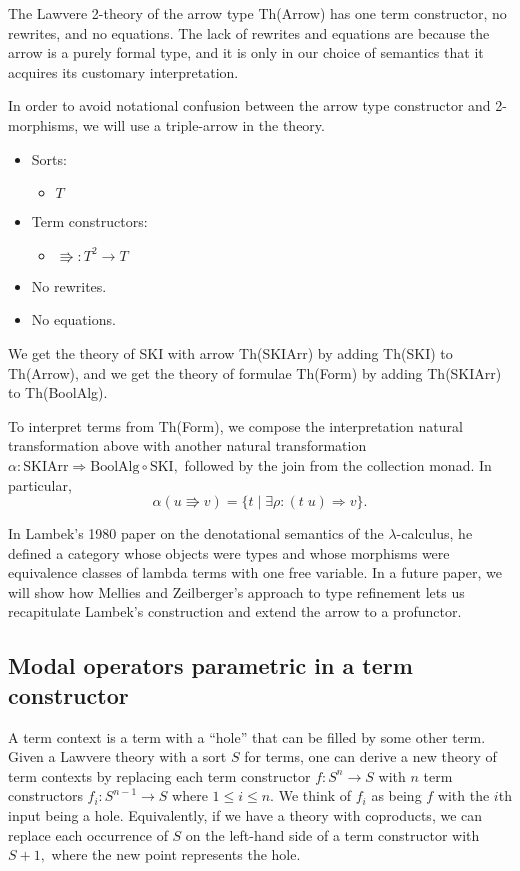 \documentclass{llncs}
\newcommand{\maps}{\colon}
\begin{document}
The Lawvere 2-theory of the arrow type Th(Arrow) has one term constructor, no rewrites, and no equations.  The lack of rewrites and equations are because the arrow is a purely formal type, and it is only in our choice of semantics that it acquires its customary interpretation.

In order to avoid notational confusion between the arrow type constructor and 2-morphisms, we will use a triple-arrow in the theory.
\begin{itemize}
  \item Sorts:
  \begin{itemize}
    \item $T$
  \end{itemize}
  \item Term constructors:
    \begin{itemize}
      \item $\Rrightarrow \maps T^2 \to T$
    \end{itemize}
  \item No rewrites.
  \item No equations.
\end{itemize}

We get the theory of SKI with arrow Th(SKIArr) by adding Th(SKI) to Th(Arrow), and we get the theory of formulae Th(Form) by adding Th(SKIArr) to Th(BoolAlg).

To interpret terms from Th(Form), we compose the interpretation natural transformation above with another natural transformation $\alpha\maps \mathrm{SKIArr} \Rightarrow \mathrm{BoolAlg} \circ \mathrm{SKI},$ followed by the join from the collection monad.  In particular, 
\[ \alpha(u \Rrightarrow v) = \{ t \;|\; \exists \rho\maps (t\; u) \Rightarrow v \}. \]

In Lambek's 1980 paper \cite{Lambek} on the denotational semantics of the $\lambda$-calculus, he defined a category whose objects were types and whose morphisms were equivalence classes of lambda terms with one free variable.  In a future paper, we will show how Mellies and Zeilberger's approach to type refinement lets us recapitulate Lambek's construction and extend the arrow to a profunctor.

\subsection{Modal operators parametric in a term constructor}

A term context is a term with a ``hole'' that can be filled by some other term.  Given a Lawvere theory with a sort $S$ for terms, one can derive a new theory of term contexts by replacing each term constructor $f\maps S^n \to S$ with $n$ term constructors $f_i\maps S^{n-1} \to S$ where $1 \le i \le n$.  We think of $f_i$ as being $f$ with the $i$th input being a hole.  Equivalently, if we have a theory with coproducts, we can replace each occurrence of $S$ on the left-hand side of a term constructor with $S+1,$ where the new point represents the hole.
\end{document}
